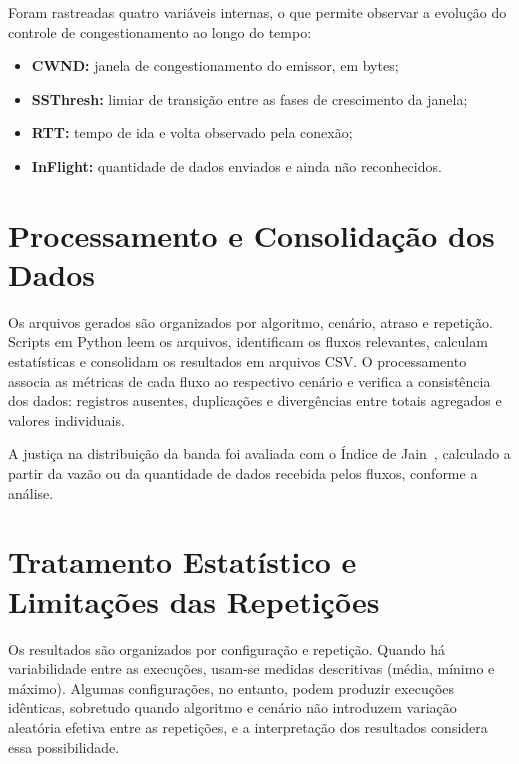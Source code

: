 Foram rastreadas quatro variáveis internas, o que permite observar a evolução do controle de congestionamento ao longo do tempo:

\begin{itemize}
    \item \textbf{CWND:} janela de congestionamento do emissor, em bytes;
    \item \textbf{SSThresh:} limiar de transição entre as fases de crescimento da janela;
    \item \textbf{RTT:} tempo de ida e volta observado pela conexão;
    \item \textbf{InFlight:} quantidade de dados enviados e ainda não reconhecidos.
\end{itemize}

\section{Processamento e Consolidação dos Dados}

Os arquivos gerados são organizados por algoritmo, cenário, atraso e repetição. Scripts em Python leem os arquivos, identificam os fluxos relevantes, calculam estatísticas e consolidam os resultados em arquivos CSV. O processamento associa as métricas de cada fluxo ao respectivo cenário e verifica a consistência dos dados: registros ausentes, duplicações e divergências entre totais agregados e valores individuais.

A justiça na distribuição da banda foi avaliada com o Índice de Jain~\cite{jain1984}, calculado a partir da vazão ou da quantidade de dados recebida pelos fluxos, conforme a análise.

\section{Tratamento Estatístico e Limitações das Repetições}

Os resultados são organizados por configuração e repetição. Quando há variabilidade entre as execuções, usam-se medidas descritivas (média, mínimo e máximo). Algumas configurações, no entanto, podem produzir execuções idênticas, sobretudo quando algoritmo e cenário não introduzem variação aleatória efetiva entre as repetições, e a interpretação dos resultados considera essa possibilidade.
